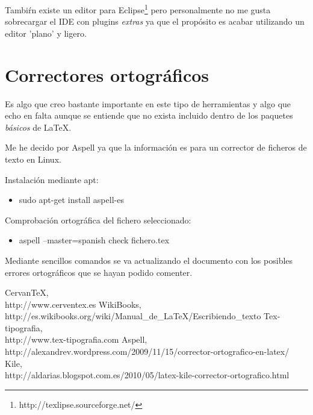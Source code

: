 \documentclass[11pt]{article}
\begin{document}
Tambi\'rn existe un editor para Eclipse\footnote{http://texlipse.sourceforge.net/} pero personalmente no me gusta sobrecargar el IDE con plugins \emph{extras} ya que el prop\'osito es acabar utilizando un editor 'plano' y ligero.

\section{Correctores ortogr\'aficos}

Es algo que creo bastante importante en este tipo de herramientas y algo que echo en falta aunque se entiende que no exista incluido dentro de los paquetes \emph{b\'asicos} de \LaTeX{}.

Me he decido por Aspell ya que la informaci\'on es para un corrector de ficheros de texto en Linux.

Instalaci\'on mediante apt: 
\begin{itemize}
	\item sudo apt-get install aspell-es
\end{itemize}
Comprobaci\'on ortogr\'afica del fichero seleccionado:
\begin{itemize}
	\item aspell –master=spanish  check fichero.tex
\end{itemize}

Mediante sencillos comandos se va actualizando el documento con los posibles errores ortogr\'aficos que se hayan podido comenter.

\begin{thebibliography}{9}

    CervanTeX,\\
    http://www.cerventex.es
    WikiBooks,\\
    http://es.wikibooks.org/wiki/Manual\_de\_LaTeX/Escribiendo\_texto
    Tex-tipografia,\\
    http://www.tex-tipografia.com 
    Aspell,\\
    http://alexandrev.wordpress.com/2009/11/15/corrector-ortografico-en-latex/
    Kile,\\
    http://aldarias.blogspot.com.es/2010/05/latex-kile-corrector-ortografico.html

\end{thebibliography}
\end{document}
